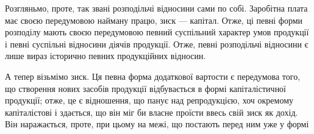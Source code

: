 Розгляньмо, проте, так звані розподільчі відносини сами по собі. Заробітна
плата має своєю передумовою найману працю, зиск — капітал. Отже, ці певні
форми розподілу мають своєю передумовою певний суспільний характер умов
продукції і певні суспільні відносини діячів продукції. Отже, певні розподільчі
відносини є лише вираз історично певних продукційних відносин.

А тепер візьмімо зиск. Ця певна форма додаткової вартости є передумова
того, що створення нових засобів продукції відбувається в формі капіталістичної
продукції; отже, це є відношення, що панує над репродукцією, хоч окремому
капіталістові і здається, що він міг би власне проїсти ввесь свій зиск як дохід. Він
наражається, проте, при цьому на межі, що постають перед ним уже у формі
\parbreak{}  %
